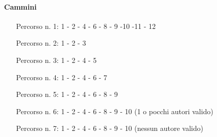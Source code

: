 \paragraph{Cammini}
\begin{itemize}
\item[Percorso n. 1: ] 1 - 2 - 4 - 6 - 8 - 9 -10 -11 - 12
\item[Percorso n. 2: ] 1 - 2 - 3
\item[Percorso n. 3: ] 1 - 2 - 4 - 5
\item[Percorso n. 4: ] 1 - 2 - 4 - 6 - 7  
\item[Percorso n. 5: ] 1 - 2 - 4 - 6 - 8 - 9
\item[Percorso n. 6: ] 1 - 2 - 4 - 6 - 8 - 9 - 10 (1 o pocchi autori valido)
\item[Percorso n. 7: ] 1 - 2 - 4 - 6 - 8 - 9 - 10 (nessun autore valido)
\end{itemize}
